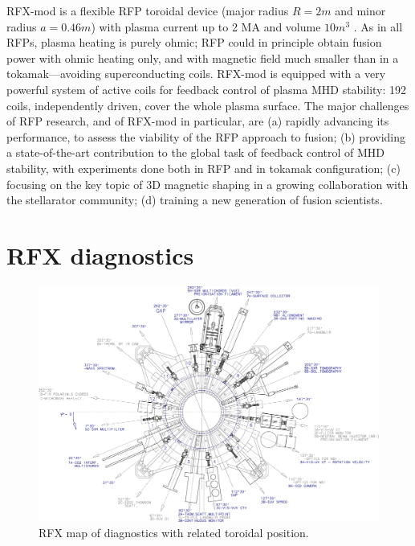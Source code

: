 RFX-mod is a flexible \ac{RFP} toroidal device (major radius $R=2 m$ and minor radius $a=0.46 m$) with plasma current up to 2 MA \cite{2MA_RFX_Current} and volume $10 m^3$ \cite{SONATO200597}. As in all RFPs, plasma heating is purely ohmic; \acl{RFP} could in principle obtain fusion power with ohmic heating only, and with magnetic field much smaller than in a tokamak—avoiding superconducting coils. RFX-mod is equipped with a very powerful system of active coils for feedback control of plasma MHD stability: 192 coils, independently driven, cover the whole plasma surface.
The major challenges of RFP research, and of RFX-mod in particular, are (a) rapidly advancing its performance, to assess the viability of the RFP approach to fusion; (b) providing a state-of-the-art contribution to the global task of feedback control of MHD stability, with experiments done both in RFP and in tokamak configuration; (c) focusing on the key topic of 3D magnetic shaping in a growing collaboration with the stellarator community; (d) training a new generation of fusion scientists.




\section{RFX diagnostics}

%
\begin{figure}[ht!]
\includegraphics[width=1\textwidth]{img/rfx/Layout_Diagnosiche_AA10005.eps} \centering
\caption{RFX map of diagnostics with related toroidal position.}
\label{rfx}
\end{figure}
%

